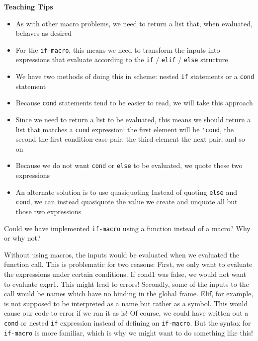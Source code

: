 \begin{guide}
\begin{blocksection}
\textbf{Teaching Tips}
  \begin{itemize}
    \item As with other macro problems, we need to return a list that, when evaluated, behaves as desired
    \item For the \lstinline{if-macro}, this means we need to transform the inputs into expressions that evaluate according to the \lstinline{if} / \lstinline{elif} / \lstinline{else} structure
    \item We have two methods of doing this in scheme: nested \lstinline{if} statements or a \lstinline{cond} statement
    \item Because \lstinline{cond} statements tend to be easier to read, we will take this
    approach
    \item Since we need to return a list to be evaluated, this means we should return a list that matches a \lstinline{cond} expression: the first element will be \lstinline{'cond}, the second the first condition-case pair, the third element the next pair, and so on
   \item Because we do not want \lstinline{cond} or \lstinline{else} to be evaluated, we quote these two expressions
   \item An alternate solution is to use quasiquoting
   Instead of quoting \lstinline{else} and \lstinline{cond}, we can instead quasiquote the value we create and unquote all but those two expressions
  \end{itemize}
\end{blocksection}
\end{guide}

\begin{blocksection}
\question Could we have implemented \texttt{if-macro} using a function instead of a macro? Why or why not?
\begin{solution}[0.5in]
Without using macros, the inputs would be evaluated when we evaluated the function call. This is problematic for two reasons:
\newline
First, we only want to evaluate the expressions under certain conditions. If cond1 was false, we would not want to evaluate expr1. This might lead to errors!
\newline
Secondly, some of the inputs to the call would be names which have no binding in the global frame. Elif, for example, is not supposed to be interpreted as a name
but rather as a symbol. This would cause our code to error if we ran it as is!
\newline
Of course, we could have written out a \texttt{cond} or nested \texttt{if} expression instead of defining an \texttt{if-macro}. But the syntax for \texttt{if-macro}
is more familiar, which is why we might want to do something like this!
\end{solution}
\end{blocksection}
